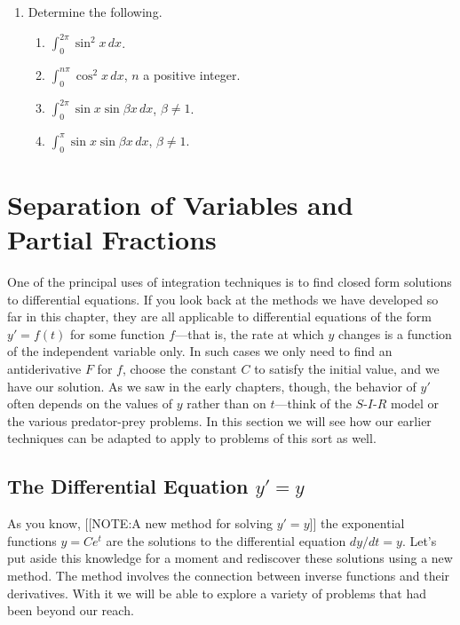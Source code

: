 \begin{enumerate}
\item Determine the following.



  \begin{enumerate}
  \item ${\displaystyle \int_0^{2\pi} \sin^2{x}\, dx}$.

  \item ${\displaystyle \int_0^{n\pi} \cos^2{x}\, dx}$, $n$ a positive integer.

  \item ${\displaystyle \int_0^{2\pi} \sin{x}
\sin{\beta x}\, dx}$, $\beta \neq 1$.

  \item ${\displaystyle \int_0^{\pi} \sin{x}
\sin{\beta x}\, dx}$, $\beta \neq 1$.
\mbox{}


\end{enumerate}
\end{enumerate}
\section{Separation of Variables and\\ Partial Fractions}
\label{sec:separation-of-variables-and-partial-fractions}

One of the principal uses of integration techniques is to find closed
form solutions to differential equations.  If you look back at the
methods we have developed so far in this chapter, they are all
applicable to differential equations of the form $y'=f(t)$ for some
function $f$---that is, the rate at which $y$ changes is a function of
the independent variable only.  In such cases we only need to find an
antiderivative $F$ for $f$, choose the constant $C$ to satisfy the
initial value, and we have our solution.  As we saw in the early
chapters, though, the behavior of $y'$ often depends on the values of
$y$ rather than on $t$---think of the $S$-$I$-$R$ model or the various
predator-prey problems.  In this section we will see how our earlier
techniques can be adapted to apply to problems of this sort as well.

\subsection{The Differential Equation $y' = y$}
\label{subsec:the-differential-equation-y-y}

As you know, 
[[NOTE:A new method for solving $y' = y$]]	
the exponential functions $y = C e^t$ are the solutions to the
differential equation $dy/dt = y$.  Let's put aside this knowledge for
a moment and rediscover these solutions using a new method.  The
method involves the connection between inverse functions and their
derivatives.  With it we will be able to explore a variety of problems
that had been beyond our reach.

